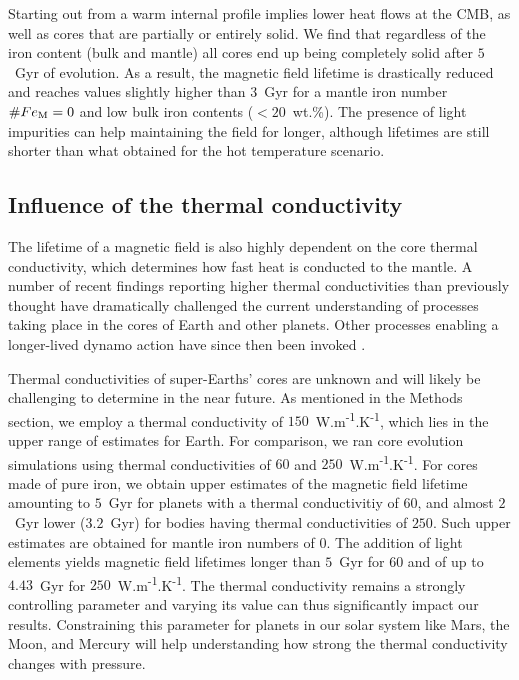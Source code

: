 \documentclass[draft]{agujournal2019} %
\begin{document}
Starting out from a warm internal profile implies lower heat flows at the CMB, as well as cores that are partially or entirely solid. We find that regardless of the iron content (bulk and mantle) all cores end up being completely solid after $5$~Gyr of evolution. As a result, the magnetic field lifetime is drastically reduced and reaches values slightly higher than $3$~Gyr for a mantle iron number $\#Fe_{\rm M}=0$ and low bulk iron contents ($<20$~wt.\%). The presence of light impurities can help maintaining the field for longer, although lifetimes are still shorter than what obtained for the hot temperature scenario. 

\subsection{Influence of the thermal conductivity}\label{sec:therm_cond}
The lifetime of a magnetic field is also highly dependent on the core thermal conductivity, which determines how fast heat is conducted to the mantle. A number of recent findings reporting higher thermal conductivities than previously thought \cite{pozzo2012thermal,gomi2013high} have dramatically challenged the current understanding of processes taking place in the cores of Earth and other planets. Other processes enabling a longer-lived dynamo action have since then been invoked \cite{o2016powering,hirose2017crystallization}.

Thermal conductivities of super-Earths' cores are unknown and will likely be challenging to determine in the near future. As mentioned in the Methods section, we employ a thermal conductivity of $150$~W.m\textsuperscript{-1}.K\textsuperscript{-1}, which lies in the upper range of estimates for Earth.
For comparison, we ran core evolution simulations using thermal conductivities of $60$ and $250$~W.m\textsuperscript{-1}.K\textsuperscript{-1}. For cores made of pure iron, we obtain upper estimates of the magnetic field lifetime amounting to $5$~Gyr for planets with  a thermal conductivitiy of $60$, and almost $2$~Gyr lower ($3.2$~Gyr) for bodies having thermal conductivities of $250$. Such upper estimates are obtained for mantle iron numbers of 0. The addition of light elements yields magnetic field lifetimes longer than $5$~Gyr for $60$ and of up to $4.43$~Gyr for $250$~W.m\textsuperscript{-1}.K\textsuperscript{-1}. 
The thermal conductivity remains a strongly controlling parameter and varying its value can thus significantly impact our results. Constraining this parameter for planets in our solar system like Mars, the Moon, and Mercury will help understanding how strong the thermal conductivity changes with pressure. 
\end{document}
